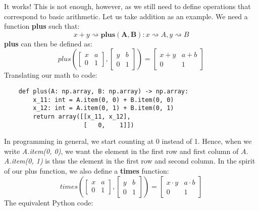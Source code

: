 It works! This is not enough, however, as we still need to define operations
that correspond to basic arithmetic. Let us take addition as an
example. We need a function \textbf{plus} such that:
\begin{equation*}
    x + y \rightsquigarrow \mathbf{plus(A, B)} : x \rightsquigarrow A, y
    \rightsquigarrow B
\end{equation*}
\textbf{plus} can then be defined as:
\begin{equation*}
    plus\left(
    \begin{bmatrix}
        x & a \\
        0 & 1
    \end{bmatrix},
    \begin{bmatrix}
        y & b \\
        0 & 1
    \end{bmatrix}
    \right)
    =
    \begin{bmatrix}
        x + y & a + b \\
        0     & 1
    \end{bmatrix}
\end{equation*}
Translating our math to code:
\begin{verbatim}
    def plus(A: np.array, B: np.array) -> np.array:
        x_11: int = A.item(0, 0) + B.item(0, 0)
        x_12: int = A.item(0, 1) + B.item(0, 1)
        return array([[x_11, x_12],
                      [   0,    1]])
\end{verbatim}
In programming in general, we start counting at 0 instead of 1. Hence, when we
write \textit{A.item(0, 0)}, we want the element in the first row and first
column
of
$ A $. \textit{A.item(0, 1)} is thus the element in the first row and second
column. In the spirit of our plus function, we also define a \textbf{times}
function:
\begin{equation*}
   times\left(
   \begin{bmatrix}
       x & a \\
       0 & 1
   \end{bmatrix},
   \begin{bmatrix}
       y & b \\
       0 & 1
   \end{bmatrix}
   \right)
   =
   \begin{bmatrix}
       x \cdot y & a  \cdot b \\
       0     & 1
   \end{bmatrix}
\end{equation*}
The equivalent Python code:
